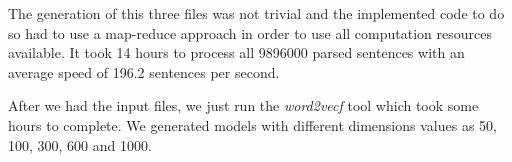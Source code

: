 The generation of this three files was not trivial and the implemented code to do so had to use a map-reduce approach in order to use all computation resources available. It took 14 hours to process all 9896000 parsed sentences with an average speed of 196.2 sentences per second.

After we had the input files, we just run the \textit{word2vecf} tool which took some hours to complete. We generated models with different dimensions values as 50, 100, 300, 600 and 1000.